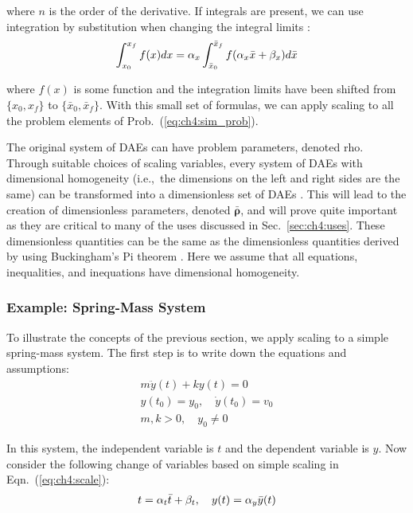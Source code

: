\noindent where $n$ is the order of the derivative. If integrals are present, we can use integration by substitution when changing the integral limits \cite{Strang1991a}:
\begin{align}
\label{eq:ch4:integral}
\int_{x_0}^{x_f} f(x) dx = \alpha_x \int_{\bar{x}_0}^{\bar{x}_f} f(\alpha_x \bar{x} + \beta_x) d\bar{x}
\end{align}

\noindent where $f(x)$ is some function and the integration limits have been shifted from $\{x_0,x_f\}$ to $\{\bar{x}_0,\bar{x}_f\}$. With this small set of formulas, we can apply scaling to all the problem elements of Prob.~(\ref{eq:ch4:sim_prob}).

The original system of DAEs can have problem parameters, denoted \gls{rho}.
Through suitable choices of scaling variables, every system of DAEs with dimensional homogeneity (i.e.,~the dimensions on the left and right sides are the same) can be transformed into a dimensionless set of DAEs \cite{Holmes2009a}.
This will lead to the creation of dimensionless parameters, denoted $\bar{\bm{\rho}}$, and will prove quite important as they are critical to many of the uses discussed in Sec.~\ref{sec:ch4:uses}. 
These dimensionless quantities can be the same as the dimensionless quantities derived by using Buckingham's Pi theorem \cite{Buckingham1914a, Holmes2009a, Groesen2007a}.
Here we assume that all equations, inequalities, and inequations have dimensional homogeneity.

\subsubsection{Example: Spring-Mass System \label{sec:ch4:ex_mass_spring}}

To illustrate the concepts of the previous section, we apply scaling to a simple spring-mass system.
The first step is to write down the equations and assumptions:
\begin{subequations}
\begin{gather}
m \ddot{y}(t) + k y(t) = 0 \\
y(t_0) = y_0, \quad \dot{y}(t_0) = v_0 \\
m, k > 0, \quad y_0 \neq 0
\end{gather}
\end{subequations}

\noindent In this system, the independent variable is $t$ and the dependent variable is $y$.
Now consider the following change of variables based on simple scaling in Eqn.~(\ref{eq:ch4:scale}):
\begin{gather}
t = \alpha_t \bar{t} + \beta_t, \quad y(t) = \alpha_y \bar{y}(t) 
\end{gather}

